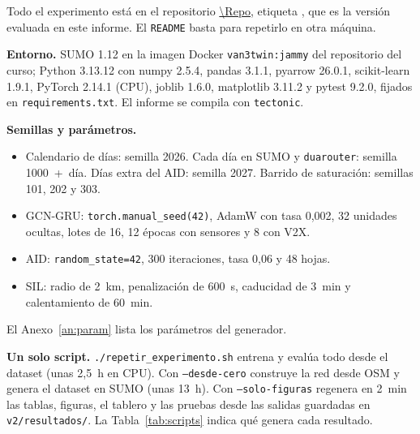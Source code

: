 Todo el experimento está en el repositorio \url{\Repo}, etiqueta \texttt{\Tag}, que es la versión evaluada en este informe. El \texttt{README} basta para repetirlo en otra máquina.

\textbf{Entorno.} SUMO 1.12 en la imagen Docker \texttt{van3twin:jammy} del repositorio del curso; Python 3.13.12 con numpy 2.5.4, pandas 3.1.1, pyarrow 26.0.1, scikit-learn 1.9.1, PyTorch 2.14.1 (CPU), joblib 1.6.0, matplotlib 3.11.2 y pytest 9.2.0, fijados en \texttt{requirements.txt}. El informe se compila con \texttt{tectonic}.

\textbf{Semillas y parámetros.}
\begin{itemize}
\item Calendario de días: semilla 2026. Cada día en SUMO y \texttt{duarouter}: semilla 1000~+~día. Días extra del AID: semilla 2027. Barrido de saturación: semillas 101, 202 y 303.
\item GCN-GRU: \texttt{torch.manual\_seed(42)}, AdamW con tasa 0,002, 32 unidades ocultas, lotes de 16, 12 épocas con sensores y 8 con V2X.
\item AID: \texttt{random\_state=42}, 300 iteraciones, tasa 0,06 y 48 hojas.
\item SIL: radio de 2~km, penalización de 600~s, caducidad de 3~min y calentamiento de 60~min.
\end{itemize}
El Anexo~\ref{an:param} lista los parámetros del generador.

\textbf{Un solo script.} \texttt{./repetir\_experimento.sh} entrena y evalúa todo desde el dataset (unas 2,5~h en CPU). Con \texttt{--desde-cero} construye la red desde OSM y genera el dataset en SUMO (unas 13~h). Con \texttt{--solo-figuras} regenera en 2~min las tablas, figuras, el tablero y las pruebas desde las salidas guardadas en \texttt{v2/resultados/}. La Tabla~\ref{tab:scripts} indica qué genera cada resultado.

